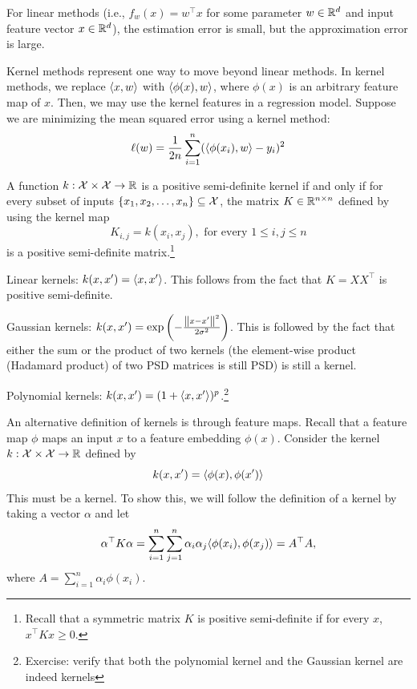 \begin{example}
For linear methods (i.e., $f_w(x) = w^{\top} x$ for some parameter $w\in\mathbb{R}^d$ and input feature vector $x\in\mathbb{R}^d$), the estimation error is small, but the approximation error is large.

Kernel methods represent one way to move beyond linear methods.
In kernel methods, we replace $\langle x, w \rangle$ with $\langle \phi(x), w \rangle$, where $\phi(x)$ is an arbitrary feature map of $x$.
Then, we may use the kernel features in a regression model.
Suppose we are minimizing the mean squared error using a kernel method:
\[ \ell(w) = \frac 1 {2n} \sum_{i=1}^n (\langle \phi(x_i), w \rangle - y_i)^2  \]
\end{example}

\begin{definition}[Kernels] A function $k: \mathcal{X} \times \mathcal{X} \rightarrow \mathbb{R}$ is a positive semi-definite kernel if and only if for every subset of inputs $\left\{x_1, x_2, \dots, x_n\right\} \subseteq \mathcal{X}$, the matrix $K\in\mathbb{R}^{n\times n}$ defined by using the kernel map
\[ K_{i, j} = k(x_i, x_j), \text{ for every } 1 \le i, j \le n \]
is a positive semi-definite matrix.\footnote{Recall that a symmetric matrix $K$ is positive semi-definite if for every $x$, $x^{\top} K x \ge 0$.}
\end{definition}

\begin{example}
    Linear kernels: $k(x, x') = \langle x, x' \rangle$. This follows from the fact that $K = XX^{\top}$ is positive semi-definite.

    Gaussian kernels: $k(x, x') = \exp\left( - \frac {\left\| x - x' \right\|^2} {2\sigma^2} \right)$.
    This is followed by the fact that either the sum or the product of two kernels (the element-wise product (Hadamard product) of two PSD matrices is still PSD) is still a kernel.

    Polynomial kernels: $k(x, x') = (1 + \langle x, x' \rangle)^p$.\footnote{{Exercise:} verify that both the polynomial kernel and the Gaussian kernel are indeed kernels}
\end{example}

An alternative definition of kernels is through feature maps.
Recall that a feature map $\phi$ maps an input $x$ to a feature embedding $\phi(x)$.
Consider the kernel $k: \mathcal{X} \times \mathcal{X} \rightarrow \mathbb{R}$ defined by
\[ k(x, x') = \langle \phi(x), \phi(x') \rangle \]
This must be a kernel.
To show this, we will follow the definition of a kernel by taking a vector $\alpha$ and let
\[ \alpha^{\top} K \alpha = \sum_{i=1}^n \sum_{j=1}^n \alpha_i \alpha_j \langle \phi(x_i), \phi(x_j) \rangle = {A}^{\top} {A}, \]
where $A = \sum_{i=1}^n \alpha_i \phi(x_i)$.

